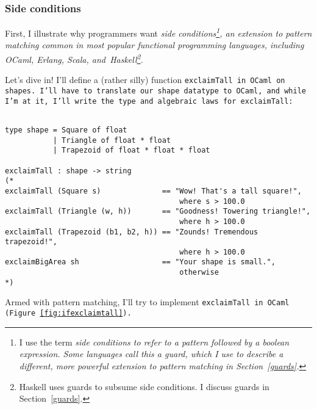 \documentclass[manuscript,screen,review, 12pt, nonacm]{acmart}
\begin{document}
\begin{outline}[enumerate]

\subsubsection{Side conditions}

    First, I illustrate why programmers want \it{side conditions}\footnote{I use
    the term \it{side conditions} to refer to a pattern followed by a boolean
    expression. Some languages call this a \it{guard}, which I use to describe a
    different, more powerful extension to pattern matching in
    Section~\ref{guards}.}, an extension to pattern matching common in most
    popular functional programming languages, including OCaml, Erlang, Scala,
    and~Haskell\footnote{Haskell uses guards to subsume side conditions. I
    discuss guards in Section~\ref{guards}.}. 
    
    Let's dive in! I'll define a (rather silly) function \tt{exclaimTall} in
    OCaml on \tt{shape}s. I'll have to translate our \tt{shape} datatype to
    OCaml, and while I'm at it, I'll write the type and algebraic laws for
    \tt{exclaimTall}:

    \begin{minipage}[t]{\textwidth}        
        \centering 
        \begin{verbatim}

type shape = Square of float 
           | Triangle of float * float
           | Trapezoid of float * float * float

exclaimTall : shape -> string 
(*
exclaimTall (Square s)              == "Wow! That's a tall square!", 
                                        where s > 100.0
exclaimTall (Triangle (w, h))       == "Goodness! Towering triangle!",
                                        where h > 100.0
exclaimTall (Trapezoid (b1, b2, h)) == "Zounds! Tremendous trapezoid!", 
                                        where h > 100.0
exclaimBigArea sh                   == "Your shape is small.", 
                                        otherwise
*)
    \end{verbatim}
    \end{minipage}

    Armed with pattern matching, I'll try to implement \tt{exclaimTall} in OCaml
    (Figure~\ref{fig:ifexclaimtall}).


\end{outline}
\end{document}
